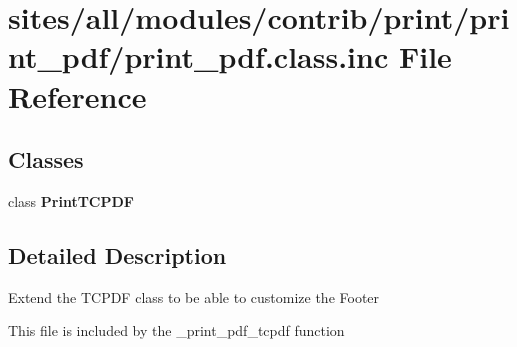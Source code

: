 \hypertarget{print__pdf_8class_8inc}{
\section{sites/all/modules/contrib/print/print\_\-pdf/print\_\-pdf.class.inc File Reference}
\label{print__pdf_8class_8inc}
}
\subsection*{Classes}
\begin{CompactItemize}
\item 
class \textbf{PrintTCPDF}
\end{CompactItemize}


\subsection{Detailed Description}
Extend the TCPDF class to be able to customize the Footer

This file is included by the \_\-print\_\-pdf\_\-tcpdf function 